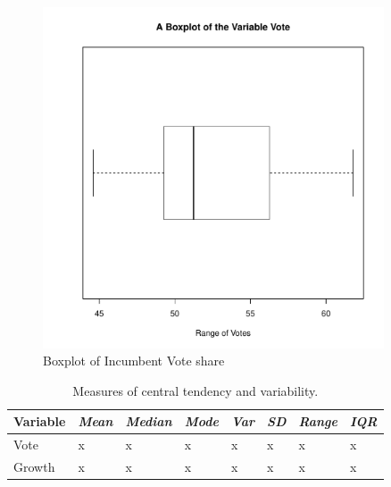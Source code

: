 \documentclass[a4paper,12pt]{article} %
\begin{document}
\begin{enumerate}
 \begin{figure}[H] %
    \centering %
    \includegraphics[width=0.9\textwidth]{box1.pdf} 
    \caption{Boxplot of Incumbent Vote share} %
  \end{figure}



\begin{table}[H]
\centering
\begin{tabular}{llllllll}
\multicolumn{1}{c}{\textbf{Variable}} & \multicolumn{1}{c}{\textit{Mean}} & \multicolumn{1}{c}{\textit{Median}} & \textit{Mode} & \textit{Var} & \textit{SD} & \textit{Range} & \textit{IQR} \\ \hline
Vote                                  & x                                 & x                                   & x             & x            & x           & x              & x            \\
Growth                                & x                                 & x                                   & x             & x            & x           & x              & x           
\end{tabular}
\caption{Measures of central tendency and variability.}
\label{my-label}
\end{table}


\end{enumerate}
\end{document}
